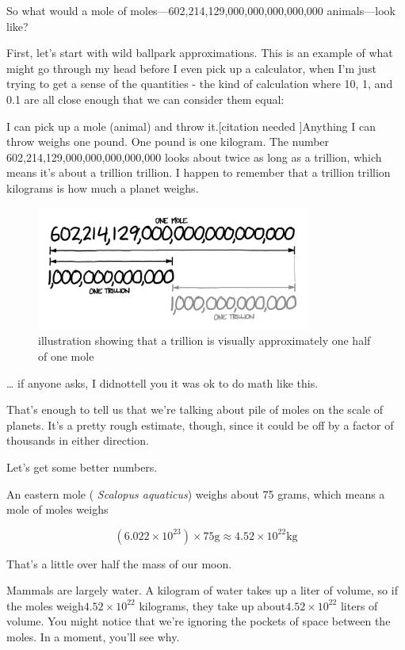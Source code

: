 {So what would a mole of moles—602,214,129,000,000,000,000,000 animals—look like?}

{First, let’s start with wild ballpark approximations. This is an example of what might go through my head before I even pick up a calculator, when I’m just trying to get a sense of the quantities - the kind of calculation where 10, 1, and 0.1 are all close enough that we can consider them equal:}

{I can pick up a mole (animal) and throw it.[{citation needed} ]Anything I can throw weighs one pound. One pound is one kilogram. The number 602,214,129,000,000,000,000,000 looks about twice as long as a trillion, which means it’s about a trillion trillion. I happen to remember that a trillion trillion kilograms is how much a planet weighs.}

\begin{figure}[!htbp]
\centering
\includegraphics[scale=0.5, max width=0.8\textwidth]{imgs/a/4/moles_number_length.png}
\caption{illustration showing that a trillion is visually approximately one half of one mole}
\end{figure}

{… if anyone asks, I didnottell you it was ok to do math like this.}

{That’s enough to tell us that we’re talking about pile of moles on the scale of planets. It’s a pretty rough estimate, though, since it could be off by a factor of thousands in either direction.}

{Let’s get some better numbers.}

{An eastern mole ( \emph{Scalopus aquaticus}) weighs about 75 grams, which means a mole of moles weighs}

{\[ (6.022\times10^{23})\times75\mathrm{g}\approx4.52\times10^{22}\mathrm{kg}\]}

{That’s a little over half the mass of our moon.}

{Mammals are largely water. A kilogram of water takes up a liter of volume, so if the moles weigh\( 4.52\times10^{22}\) kilograms, they take up about\( 4.52\times10^{22}\) liters of volume. You might notice that we’re ignoring the pockets of space between the moles. In a moment, you’ll see why.}

